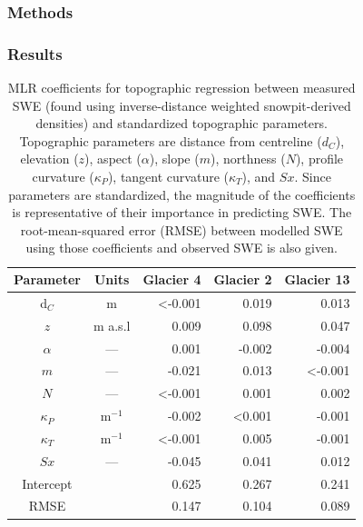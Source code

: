 \documentclass[12pt]{article}
\newcommand{\params}{Topographic parameters are distance from centreline ($d_C$), elevation ($z$), aspect ($\alpha$), slope ($m$), northness ($N$), profile curvature ($\kappa_P$), tangent curvature ($\kappa_T$), and $Sx$. }
\begin{document}
\subsubsection{Methods}



\subsubsection{Results}

\begin{table}
\centering
\caption{MLR coefficients for topographic regression between measured SWE (found using inverse-distance weighted snowpit-derived densities) and standardized topographic parameters. \params  Since parameters are standardized, the magnitude of the coefficients is representative of their importance in predicting SWE. The root-mean-squared error (RMSE) between modelled SWE using those coefficients and observed SWE is also given.}
\label{tab:MLRcoeff}
\begin{tabular}{ccrrr}
 Parameter & Units & \textbf{Glacier 4} & \textbf{Glacier 2} & \textbf{Glacier 13} \\ \hline
d$_C$ 			&m&  \textless-0.001		& 0.019 					& 0.013 \\
$z$ 				&m a.s.l & 0.009 						& 0.098					& 0.047 \\
$\alpha$ 		& ---& 0.001 						& -0.002 					& -0.004 \\
$m$ 			& ---& -0.021 						& 0.013					 &  \textless-0.001 \\
$N$ 				& ---& \textless-0.001		  	& 0.001 					& 0.002 \\
$\kappa_P$ &m$^{-1}$& -0.002 						& \textless0.001 		& -0.001 \\
$\kappa_T$&m$^{-1}$ & \textless-0.001 		& 0.005 					& -0.001 \\
$Sx$ 			& ---& -0.045 						& 0.041 					&0.012 \\
Intercept 		&& 0.625 						& 0.267 					& 0.241 \\ \hline
RMSE 			&& 0.147						& 0.104 					& 0.089
\end{tabular}
\end{table}
\end{document}
